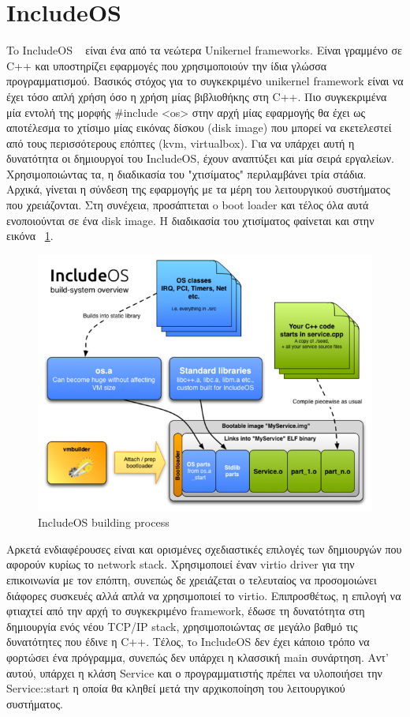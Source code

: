 \section{IncludeOS}
To IncludeOS ~\cite{bratterud2015includeos} είναι ένα από τα νεώτερα Unikernel
frameworks. Είναι γραμμένο σε C++ και υποστηρίζει εφαρμογές που χρησιμοποιούν την
ίδια γλώσσα προγραμματισμού. Βασικός στόχος για το συγκεκριμένο unikernel framework είναι
να έχει τόσο απλή χρήση όσο η χρήση μίας βιβλιοθήκης στη C++. Πιο συγκεκριμένα
μία εντολή της μορφής \#include <os> στην αρχή μίας εφαρμογής θα έχει ως
αποτέλεσμα το χτίσιμο μίας εικόνας δίσκου (disk image) που μπορεί να εκετελεστεί
από τους περισσότερους επόπτες (kvm, virtualbox). Για να υπάρχει αυτή η
δυνατότητα οι δημιουργοί του IncludeOS, έχουν αναπτύξει και μία σειρά εργαλείων.
Χρησιμοποιώντας τα, η διαδικασία του "χτισίματος" περιλαμβάνει τρία στάδια.
Αρχικά, γίνεται η σύνδεση της εφαρμογής με τα μέρη του λειτουργικού συστήματος
που χρειάζονται. Στη συνέχεια, προσάπτεται o boot loader και τέλος όλα αυτά
ενοποιούνται σε ένα disk image. Η διαδικασία του χτισίματος φαίνεται και στην
εικόνα ~\ref{fig3_5}. 

\begin{figure}[htp]
\centering
\includegraphics[scale=0.6]{figures/includeos_buil_system.png}
\caption{IncludeOS building process\label{fig3_5}}
\end{figure}

Αρκετά ενδιαφέρουσες είναι και ορισμένες σχεδιαστικές επιλογές των δημιουργών
που αφορούν κυρίως το network stack. Χρησιμοποιεί έναν virtio driver για την
επικοινωνία με τον επόπτη, συνεπώς δε χρειάζεται ο τελευταίος να προσομοιώνει
διάφορες συσκευές αλλά απλά να χρησιμοποιεί το virtio. Επιπροσθέτως, η επιλογή
να φτιαχτεί από την αρχή το συγκεκριμένο framework, έδωσε τη δυνατότητα στη
δημιουργία ενός νέου TCP/IP stack, χρησιμοποιώντας σε μεγάλο βαθμό τις
δυνατότητες που έδινε η C++. Τέλος, τo IncludeOS δεν έχει κάποιο τρόπο να
φορτώσει ένα πρόγραμμα, συνεπώς δεν υπάρχει η κλασσική main συνάρτηση. Αντ'
αυτού, υπάρχει η κλάση Service και ο προγραμματιστής πρέπει να υλοποιήσει την
Service::start η οποία θα κληθεί μετά την αρχικοποίηση του λειτουργικού
συστήματος. 

